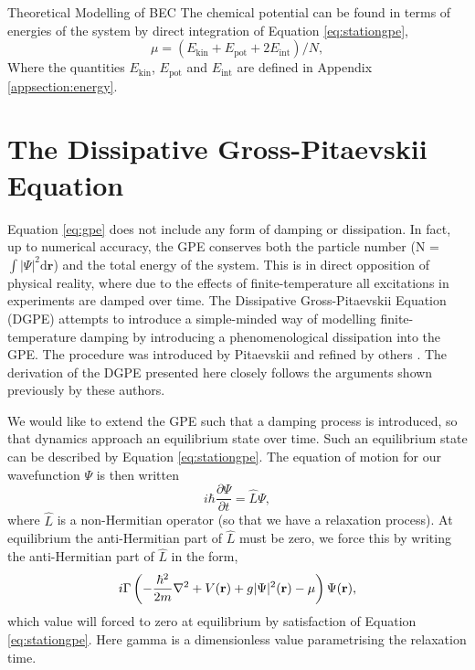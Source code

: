 \begin{chapter}{\label{cha:theoretical_model}Theoretical Modelling of BEC}
The chemical potential can be found in terms of energies of the system by direct integration of Equation \ref{eq:stationgpe},
	\begin{equation}\label{eq:chempot}
		\mu = \left ( E_{\mathrm{kin}} + E_{\mathrm{pot}} + 2E_{\mathrm{int}} \right ) / N,
	\end{equation}
	Where the quantities $E_{\mathrm{kin}}$, $E_{\mathrm{pot}}$ and $E_{\mathrm{int}}$ are defined in Appendix \ref{appsection:energy}.


\section{\label{section:dgpe} The Dissipative Gross-Pitaevskii Equation}

	Equation \ref{eq:gpe} does not include any form of damping or dissipation. In fact, up to numerical accuracy, the GPE conserves both the particle number (N = $\int |\Psi|^2 \mathrm{d}\mathbf{r}$) and the total energy of the system. This is in direct opposition of physical reality, where due to the effects of finite-temperature all excitations in experiments are damped over time. The Dissipative Gross-Pitaevskii Equation (DGPE) attempts to introduce a simple-minded way of modelling finite-temperature damping by introducing a phenomenological dissipation into the GPE. The procedure was introduced by Pitaevskii \cite{lifshitzpitaevskii81} and refined by others \cite{choi_morgan_98,tsubota_kasamatsu_02,madarassy_barenghi_08}. The derivation of the DGPE presented here closely follows the arguments shown previously by these authors.

	We would like to extend the GPE such that a damping process is introduced, so that dynamics approach an equilibrium state over time. Such an equilibrium state can be described by Equation \ref{eq:stationgpe}. The equation of motion for our wavefunction $\Psi$ is then written 
		\begin{equation}\label{eq:disseqmotion}
		i\hbar \frac{\partial \Psi}{\partial t} = \hat{L}\Psi,
		\end{equation}
	where $\hat{L}$ is a non-Hermitian operator (so that we have a relaxation process). At equilibrium the anti-Hermitian part of $\hat{L}$ must be zero, we force this by writing the anti-Hermitian part of $\hat{L}$ in the form,
	\begin{equation*}\label{eq:dissantiherm}
		i\Gamma\left( -\frac{\hbar^2}{2m}\nabla^2 + V({\bf r}) + g|\Psi|^2({\bf r}) - \mu \right) \Psi({\bf r}),
	\end{equation*}
	which value will forced to zero at equilibrium by satisfaction of Equation \ref{eq:stationgpe}. Here gamma is a dimensionless value parametrising the relaxation time.


\end{chapter}
